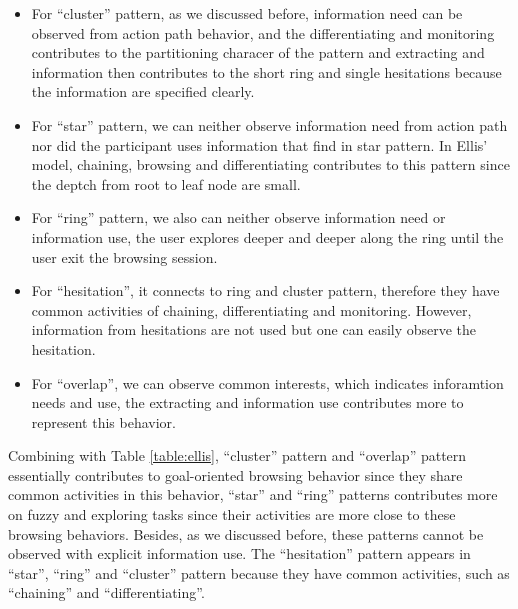 \begin{itemize}
    \item For ``cluster'' pattern, as we discussed before, information need can be observed from action path behavior,
    and the differentiating and monitoring contributes to the partitioning characer of the pattern
    and extracting and information then contributes to the short ring and single hesitations
    because the information are specified clearly.
    \item For ``star'' pattern, we can neither observe information need from action path nor did the participant uses
    information that find in star pattern. In Ellis' model, chaining, browsing and differentiating contributes to this pattern
    since the deptch from root to leaf node are small.
    \item For ``ring'' pattern, we also can neither observe information need or information use, the user explores deeper and deeper
    along the ring until the user exit the browsing session.
    \item For ``hesitation'', it connects to ring and cluster pattern, therefore they have common activities of chaining, differentiating and monitoring.
    However, information from hesitations are not used but one can easily observe the hesitation.
    \item For ``overlap'', we can observe common interests, which indicates inforamtion needs and use, the extracting
    and information use contributes more to represent this behavior.
\end{itemize}

Combining with Table \ref{table:ellis}, ``cluster'' pattern and ``overlap'' pattern 
essentially contributes to goal-oriented browsing behavior since they share common activities 
in this behavior, 
``star'' and ``ring'' patterns contributes more on fuzzy and exploring tasks 
since their activities are more close to these browsing behaviors. 
Besides, as we discussed before, these patterns cannot be observed with explicit information use.
The ``hesitation'' pattern appears in ``star'', ``ring'' and ``cluster'' pattern 
because they have common activities, such as ``chaining'' and ``differentiating''.

\cleardoublepage